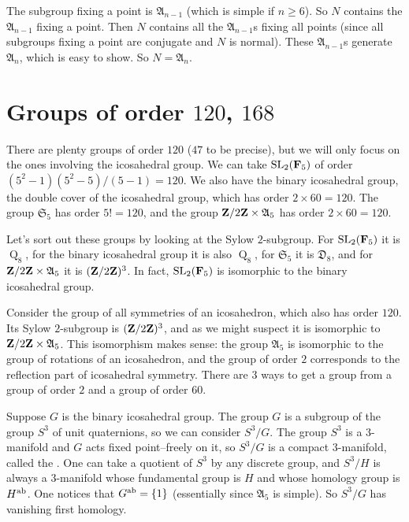 \documentclass[11pt, twoside]{amsart}
\begin{document}
The subgroup fixing a point is $\mathfrak{A}_{n-1}$ (which is simple if $n\ge 6$). So $N$ contains the $\mathfrak{A}_{n-1}$ fixing a point. Then $N$ contains all the $\mathfrak{A}_{n-1}$s fixing all points (since all subgroups fixing a point are conjugate and $N$ is normal). These $\mathfrak{A}_{n-1}$s generate $\mathfrak{A}_n$, which is easy to show. So $N= \mathfrak{A}_n$.

\section{Groups of order $120$, $168$}
There are plenty groups of order $120$ ($47$ to be precise), but we will only focus on the ones involving the icosahedral group. We can take $\operatorname{SL}_2(\mathbf F_5)$ of order $(5^2 - 1)(5^2 -5)/(5-1)=120$. We also have the binary icosahedral group, the double cover of the icosahedral group, which has order $2\times 60 =120$. The group $\mathfrak{S}_5$ has order $5!= 120$, and the group $\mathbf{Z}/2\mathbf{Z}  \times \mathfrak{A}_5$ has order $2\times 60=120$.

Let's sort out these groups by looking at the Sylow $2$-subgroup. For $\operatorname{SL}_2(\mathbf F_5)$ it is $\operatorname{Q}_8 $, for the binary icosahedral group it is also $\operatorname{Q}_8 $, for $\mathfrak{S}_5$ it is $\mathfrak{D}_8$, and for $\mathbf{Z}/2\mathbf{Z}  \times \mathfrak{A}_5$ it is $(\mathbf{Z}/2\mathbf{Z} )^3$. In fact, $\operatorname{SL}_2(\mathbf F_5)$ is isomorphic to the binary icosahedral group. 

Consider the group of all symmetries of an icosahedron, which also has order $120$. Its Sylow $2$-subgroup is $(\mathbf{Z}/2\mathbf{Z} )^3$, and as we might suspect it is isomorphic to $\mathbf{Z}/2\mathbf{Z}  \times \mathfrak{A}_5$. This isomorphism makes sense: the group $\mathfrak{A}_5$ is isomorphic to the group of rotations of an icosahedron, and the group of order $2$ corresponds to the reflection part of icosahedral symmetry. There are $3$ ways to get a group from a group of order $2$ and a group of order $60$.

Suppose $G$ is the binary icosahedral group. The group $G$ is a subgroup of the group $S^3$ of unit quaternions, so we can consider $S^3/G$. The group $S^3$ is a $3$-manifold and $G$ acts fixed point--freely on it, so $S^3/G$ is a compact $3$-manifold, called the . One can take a quotient of $S^3$ by any discrete group, and $S^3/H$ is always a $3$-manifold whose fundamental group is $H$ and whose homology group is $H\textsuperscript {ab}$. One notices that $G\textsuperscript {ab} =\{1\}$ (essentially since $\mathfrak{A}_5$ is simple). So $S^3/G$ has vanishing first homology.
\end{document}
